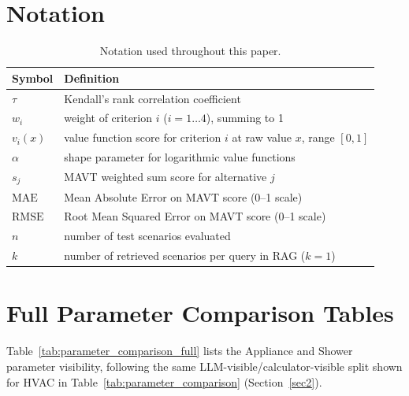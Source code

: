 \documentclass[final,3p,times]{elsarticle}
\begin{document}


\newpage

\appendix
\section{Notation}
\label{app:notation}
\begin{table}[t]
\begin{threeparttable}
\small
\centering
\renewcommand{\arraystretch}{1.15}
\begin{tabular}{ll}
\toprule
Symbol & Definition \\
\midrule
$\tau$ & Kendall's rank correlation coefficient \\
$w_i$ & weight of criterion $i$ ($i=1\ldots4$), summing to 1 \\
$v_i(x)$ & value function score for criterion $i$ at raw value $x$, range $[0,1]$ \\
$\alpha$ & shape parameter for logarithmic value functions \\
$s_j$ & MAVT weighted sum score for alternative $j$ \\
$\text{MAE}$ & Mean Absolute Error on MAVT score (0--1 scale) \\
$\text{RMSE}$ & Root Mean Squared Error on MAVT score (0--1 scale) \\
$n$ & number of test scenarios evaluated \\
$k$ & number of retrieved scenarios per query in RAG ($k=1$) \\
\bottomrule
\end{tabular}
\renewcommand{\arraystretch}{1.0}
\caption{Notation used throughout this paper.}
\label{tab:item1}
\end{threeparttable}
\end{table}

\section{Full Parameter Comparison Tables}
\label{app:parameter_comparison_full}

Table~\ref{tab:parameter_comparison_full} lists the Appliance and Shower parameter visibility, following the same LLM-visible/calculator-visible split shown for HVAC in Table~\ref{tab:parameter_comparison} (Section~\ref{sec2}).
\end{document}
